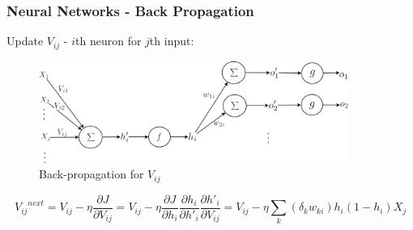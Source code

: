 \documentclass{beamer}
\begin{document}
\begin{frame}
\frametitle{Neural Networks - Back Propagation}
Update $V_{ij}$ - $i$th neuron for $j$th input:
\begin{figure}[t!]
    \centering
    \includegraphics[width=0.9\textwidth]{../paper/pictures/figures/BP2.png}
    \caption{Back-propagation for $V_{ij}$}
    \label{fig:BP2}
\end{figure}
$$
{{V_{ij}}^{next}}
= V_{ij} - \eta\frac{\partial J}{\partial V_{ij}}
= V_{ij} - \eta\frac{\partial J}{\partial h_i}\frac{\partial h_i}{\partial h'_i}\frac{\partial h'_i}{\partial V_{ij}}
= V_{ij} - \eta\sum_k(\delta_kw_{ki})h_i(1-h_i)X_j
$$

\end{frame}
\end{document}
